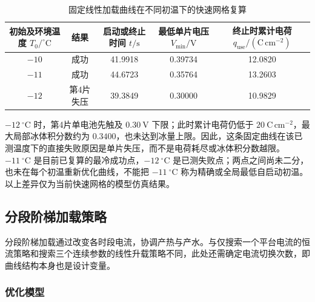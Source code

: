\documentclass{gmcmthesis}
\begin{document}
\begin{table}[H]
  \centering
  \caption{固定线性加载曲线在不同初温下的快速网格复算}
  \label{tab:q2-linear-lowtemp}
  \begin{tabular}{ccccc}
    \toprule
    \shortstack{初始及环境温度\\$T_0/^{\circ}\mathrm{C}$} & 结果 & \shortstack{启动或终止时间\\$t/\mathrm{s}$} & \shortstack{最低单片电压\\$V_{\min}/\mathrm{V}$} & \shortstack{终止时累计电荷\\$q_{\mathrm{use}}/(\mathrm{C\,cm^{-2}})$}\\
    \midrule
    $-10$ & 成功 & 41.9918 & 0.39734 & 12.0820\\
    $-11$ & 成功 & 44.6723 & 0.35764 & 13.2603\\
    $-12$ & 第4片失压 & 39.3849 & 0.30000 & 10.9829\\
    \bottomrule
  \end{tabular}
\end{table}

$-12~^{\circ}\mathrm{C}$ 时，第4片单电池先触及 $0.30~\mathrm{V}$ 下限；此时累计电荷仍低于 $20~\mathrm{C\,cm^{-2}}$，最大局部冰体积分数约为 $0.3400$，也未达到冰量上限。因此，这条固定曲线在该已测温度下的直接失败原因是单片失压，而不是电荷耗尽或冰体积分数越限。$-11~^{\circ}\mathrm{C}$ 是目前已复算的最冷成功点，$-12~^{\circ}\mathrm{C}$ 是已测失败点；两点之间尚未二分，也未在每个初温重新优化曲线，不能把 $-11~^{\circ}\mathrm{C}$ 称为精确或全局最低自启动初温。以上差异仅为当前快速网格的模型仿真结果。


\clearpage
\subsection{分段阶梯加载策略}
\label{subsec:q2-step}

分段阶梯加载通过改变各时段电流，协调产热与产水。与仅搜索一个平台电流的恒流策略和搜索三个连续参数的线性升载策略不同，此处还需确定电流切换次数，即曲线结构本身也是设计变量。

\subsubsection{优化模型}
\label{subsec:q2-step-model}
\end{document}
